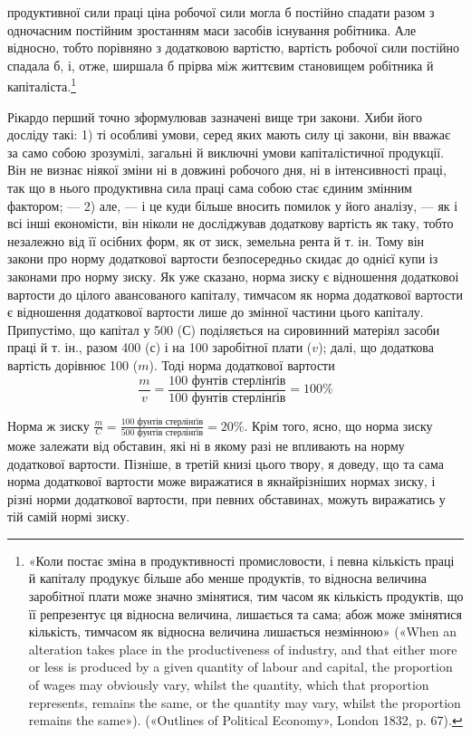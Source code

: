 \parcont{}  %
продуктивної сили праці ціна робочої сили могла б постійно
спадати разом з одночасним постійним зростанням маси засобів
існування робітника. Але відносно, тобто порівняно з додатковою
вартістю, вартість робочої сили постійно спадала б, і, отже,
ширшала б прірва між життєвим становищем робітника й капіталіста.\footnote{
«Коли постає зміна в продуктивності промисловости, і певна
кількість праці й капіталу продукує більше або менше продуктів, то
відносна величина заробітної плати може значно змінятися, тим часом як
кількість продуктів, що її репрезентує ця відносна величина, лишається
та сама; абож може змінятися кількість, тимчасом як відносна
величина лишається незмінною» («When an alteration takes place in the productiveness
of industry, and that either more or less is produced by a given
quantity of labour and capital, the proportion of wages may obviously
vary, whilst the quantity, which that proportion represents, remains the
same, or the quantity may vary, whilst the proportion remains the same»).
(«Outlines of Political Economy», London 1832, p. 67).
}

Рікардо перший точно зформулював зазначені вище три закони.
Хиби його досліду такі: 1) ті особливі умови, серед яких
мають силу ці закони, він вважає за само собою зрозумілі, загальні
й виключні умови капіталістичної продукції. Він не визнає
ніякої зміни ні в довжині робочого дня, ні в інтенсивності
праці, так що в нього продуктивна сила праці сама собою стає
єдиним змінним фактором; — 2) але, — і це куди більше вносить
помилок у його аналізу, — як і всі інші економісти, він ніколи
не досліджував додаткову вартість як таку, тобто незалежно
від її осібних форм, як от зиск, земельна рента й т. ін. Тому
він закони про норму додаткової вартости безпосередньо скидає
до однієї купи із законами про норму зиску. Як уже сказано,
норма зиску є відношення додатковоі вартости до цілого
авансованого капіталу, тимчасом як норма додаткової вартости
є відношення додаткової вартости лише до змінної частини
цього капіталу. Припустімо, що капітал у 500
($С$) поділяється на сировинний матеріял засоби праці й т. ін.,
разом 400 ($с$) і на 100 заробітної
плати ($v$); далі, що додаткова вартість дорівнює 100 ($m$). Тоді норма додаткової вартости\[
   \frac{m}{v} = \frac{100\text{ фунтів стерлінґів}}{100\text{ фунтів стерлінґів}} = 100\%
\]

Норма ж зиску $ \frac{m}{C} = \frac{100\text{ фунтів стерлінґів}}{500\text{ фунтів стерлінґів}} = 20\%$. Крім того,
ясно, що норма зиску може залежати від обставин, які ні в якому
разі не впливають на норму додаткової вартости. Пізніше, в
третій книзі цього твору, я доведу, що та сама норма додаткової
вартости може виражатися в якнайрізніших нормах зиску, і
різні норми додаткової вартости, при певних обставинах, можуть
виражатись у тій самій нормі зиску.
